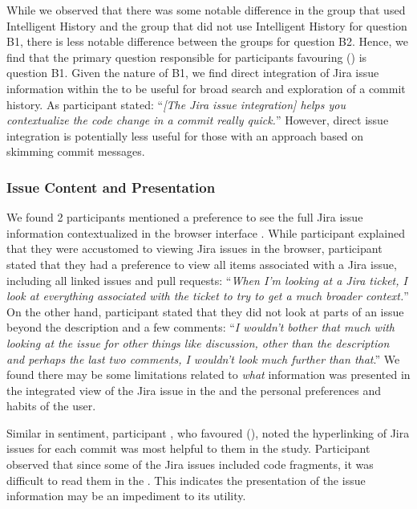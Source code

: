 While we observed that there was some notable difference in the group that used Intelligent History 
and the group that did not use Intelligent History for question B1,
there is less notable difference between the groups for question B2.
Hence, we find that the primary question responsible for participants favouring () is question B1.
Given the nature of B1, we find direct integration of Jira issue information within the  
to be useful for broad search and exploration of a commit history.
As participant  stated:
``\textit{[The Jira issue integration] helps you contextualize the code change in a commit really quick.}''
However, direct issue integration is potentially less useful for those with an approach based on skimming commit messages.

\subsubsection{Issue Content and Presentation}

We found 2 participants mentioned a preference to see the full Jira issue information contextualized in the browser interface .
While participant  explained that they were accustomed to viewing Jira issues in the browser,
participant  stated that they had a preference to view all items associated with a Jira issue, including all linked issues and pull requests:
``\textit{When I’m looking at a Jira ticket, I look at everything associated with the ticket to try to get a much broader context.}''
On the other hand,
participant  stated that they did not look at parts of an issue beyond the description and a few comments:
``\textit{I wouldn’t bother that much with looking at the issue for other things like discussion, other than the description and perhaps the last two comments, 
I wouldn’t look much further than that}.''
We found there may be some limitations related to \emph{what} information was presented in the integrated view of the Jira issue in the 
and the personal preferences and habits of the user.

Similar in sentiment, participant , who favoured (), noted the hyperlinking of Jira issues for each commit
was most helpful to them in the study.
Participant  observed that since some of the Jira issues 
included code fragments, it was difficult to read them in the .
This indicates the presentation of the issue information may be an impediment to its utility.

